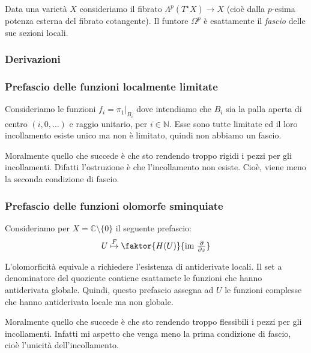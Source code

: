 Data una varietà $X$ consideriamo il fibrato $\Lambda^p(T^\star X)\to X$ (cioè dalla $p$-esima potenza esterna del fibrato cotangente).
Il funtore $\Omega^p$ è esattamente il {\it fascio} delle sue sezioni locali.





\subsubsection*{Derivazioni}





\subsubsection*{Prefascio delle funzioni localmente limitate}


Consideriamo le funzioni $f_i=\pi_1\vert_{B_i}$ dove intendiamo che $B_i$ sia la palla aperta di centro $(i,0,\ldots)$ e raggio unitario, per $i\in\mathbb N$.
Esse sono tutte limitate ed il loro incollamento esiste unico ma non è limitato, quindi non abbiamo un fascio.

Moralmente quello che succede è che sto rendendo troppo rigidi i pezzi per gli incollamenti. Difatti l'ostruzione è che l'incollamento non esiste. Cioè, viene meno la seconda condizione di fascio.


\subsubsection*{Prefascio delle funzioni olomorfe sminquiate}

Consideriamo per $X = \mathbb C\setminus \{0\}$ il seguente prefascio:
\[U\overset{F}\mapsto \faktor{H(U)}{\textstyle \text{im }\frac{\partial}{\partial z}}\]

L'olomorficità equivale a richiedere l'esistenza di antiderivate locali.
Il set a denominatore del quoziente contiene esattamete le funzioni che hanno antiderivata globale.
Quindi, questo prefascio assegna ad $U$ le funzioni complesse che hanno antiderivata locale ma non globale.

Moralmente quello che succede è che sto rendendo troppo flessibili i pezzi per gli incollamenti. Infatti mi aspetto che venga meno la prima condizione di fascio, cioè l'unicità dell'incollamento.

